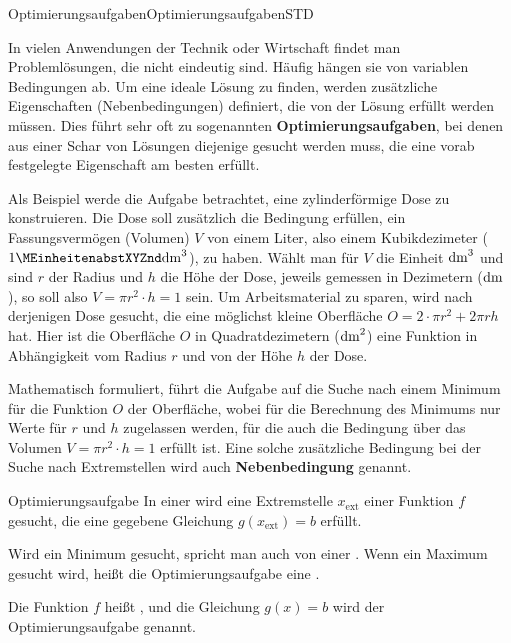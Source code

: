 \begin{MXContent}{Optimierungsaufgaben}{Optimierungsaufgaben}{STD}

In vielen Anwendungen der Technik oder Wirtschaft findet man Problemlösungen, die nicht eindeutig sind. Häufig hängen sie von variablen Bedingungen ab. Um eine ideale Lösung zu finden, werden zusätzliche Eigenschaften (Nebenbedingungen) definiert, die von der Lösung erfüllt werden müssen. Dies führt sehr oft zu sogenannten \textbf{Optimierungsaufgaben}, bei denen aus einer Schar von Lösungen diejenige gesucht werden muss, die eine vorab festgelegte Eigenschaft am besten erfüllt.

Als Beispiel werde die Aufgabe betrachtet, eine zylinderförmige Dose zu konstruieren. Die Dose soll zusätzlich die Bedingung erfüllen, ein 
Fassungsvermögen (Volumen) $V$ von einem Liter, also einem Kubikdezimeter ($1 \MEinheit{dm}^3$), zu haben. Wählt man für $V$ die
Einheit $\MEinheit[]{dm}^3$ und
sind $r$ der Radius und $h$ die Höhe der Dose, jeweils gemessen in Dezimetern ($\MEinheit[]{dm}$), so soll also $V = \pi r^2 \cdot h = 1$ sein.
Um Arbeitsmaterial zu sparen, wird nach derjenigen Dose gesucht, die eine möglichst kleine Oberfläche
$O = 2 \cdot \pi r^2 + 2 \pi r h$ hat. Hier ist die Oberfläche $O$ in Quadratdezimetern ($\MEinheit[]{dm}^2$)
eine Funktion in Abhängigkeit vom Radius $r$ und von der Höhe $h$ der Dose.

Mathematisch formuliert, führt die Aufgabe auf die Suche nach einem Minimum für die Funktion $O$ der Oberfläche, wobei für die Berechnung des Minimums nur 
Werte für $r$ und $h$ zugelassen werden, für die auch die Bedingung über das Volumen $V = \pi r^2 \cdot h = 1$ erfüllt ist. Eine solche zusätzliche
Bedingung bei der Suche nach Extremstellen wird auch \textbf{Nebenbedingung} genannt.

\begin{MXInfo}{Optimierungsaufgabe}
In einer  wird eine
Extremstelle $x_{\text{ext}}$ einer Funktion $f$ gesucht, die eine 
gegebene Gleichung $g(x_{\text{ext}}) = b$ erfüllt.

Wird ein Minimum gesucht, spricht man auch von einer 
. Wenn ein Maximum gesucht
wird, heißt die Optimierungsaufgabe eine 
.

Die Funktion $f$ heißt , und die 
Gleichung $g(x) = b$ wird  der 
Optimierungsaufgabe genannt.
\end{MXInfo}


\end{MXContent}

